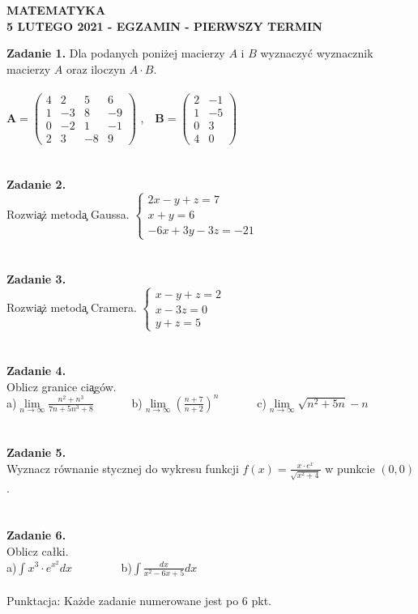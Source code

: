 \documentclass[12pt]{report}
\begin{document}
\begin{center}
\textbf{MATEMATYKA \\5 LUTEGO 2021 - EGZAMIN - PIERWSZY TERMIN}
\end{center}
\textbf{Zadanie 1.} 
Dla podanych poniżej macierzy $A$ i $B$ wyznaczyć wyznacznik macierzy $A$ oraz iloczyn $A\cdot B$.
\\\\
$
\mathbf{A} =
\left( \begin{array}{cccc}
4 & 2& 5 & 6\\
1 & -3& 8 & -9\\
0 & -2& 1 & -1\\
2 & 3 & -8 & 9 
\end{array} \right)
$ ,\ \ 
$
\mathbf{B} =
\left( \begin{array}{cccc}
2 & -1\\
1 & -5\\
0 & 3\\
4 & 0  
\end{array} \right)
$
\\\\\\\textbf{Zadanie 2.} 
\\Rozwi\c{a}\.z metod\c{a} Gaussa. 
$
\left\{ \begin{array}{ll}
2x-y+z=7\\
x+y=6\\
-6x+3y-3z=-21
\end{array} \right.
$
\\\\\\\textbf{Zadanie 3.} 
\\Rozwi\c{a}\.z metod\c{a} Cramera. 
$
\left\{ \begin{array}{ll}
x-y+z=2\\
x-3z=0\\
y+z=5
\end{array} \right.
$
\\\\\\\textbf{Zadanie 4.}
\\Oblicz granice ci\c{a}g\'ow.
\\a)$\lim\limits_{n\to\infty}\frac{n^2+n^3}{7n+5n^3+8}$
\ \ \ \ \ \  b)$\lim\limits_{n\to \infty}(\frac{n+7}{n+2})^n$
\ \ \ \ \ \ c)$\lim\limits_{n\to\infty} \sqrt{n^2+5n}-n$
\\\\\\\textbf{Zadanie 5.}
\\Wyznacz równanie stycznej do wykresu funkcji $f(x)=\frac{x\cdot e^x}{\sqrt{x^2+4}}$ w punkcie $(0,0)$. 
\\\\\\\textbf{Zadanie 6.}
\\Oblicz całki. 
\\a)$\int x^3\cdot e^{x^2} dx$ \ \ \ \ \ \ \ \ b)$\int \frac{dx}{x^2-6x+5} dx$
\\\\Punktacja: Każde zadanie numerowane jest po 6 pkt.
\end{document}
